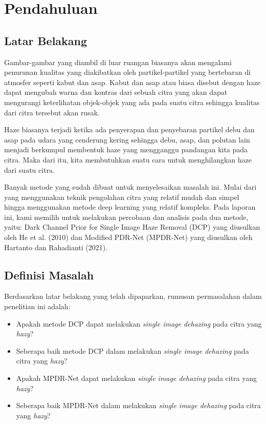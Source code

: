 \documentclass[11pt, a4paper, final]{report}
\begin{document}
\chapter{Pendahuluan}
\section{Latar Belakang}
Gambar-gambar yang diambil di luar ruangan biasanya akan mengalami penurunan kualitas yang diakibatkan oleh partikel-partikel yang bertebaran di atmosfer seperti kabut dan asap. Kabut dan asap atau biasa disebut dengan haze dapat mengubah warna dan kontras dari sebuah citra yang akan dapat mengurangi keterlihatan objek-objek yang ada pada suatu citra sehingga kualitas dari citra tersebut akan rusak.

Haze biasanya terjadi ketika ada penyerapan dan penyebaran partikel debu dan asap pada udara yang cenderung kering sehingga debu, asap, dan polutan lain menjadi berkumpul membentuk haze yang mengganggu pandangan kita pada citra. Maka dari itu, kita membutuhkan suatu cara untuk menghilangkan haze dari suatu citra. 

Banyak metode yang sudah dibuat untuk menyelesaikan masalah ini. Mulai dari yang menggunakan teknik pengolahan citra yang relatif mudah dan simpel hingga menggunakan metode deep learning yang relatif kompleks. Pada laporan ini, kami memilih untuk melakukan percobaan dan analisis pada dua metode, yaitu: Dark Channel Prior for Single Image Haze Removal (DCP) yang diusulkan oleh He et al. (2010) dan Modified PDR-Net (MPDR-Net) yang diusulkan oleh Hartanto dan Rahadianti (2021).

\section{Definisi Masalah}

Berdasarkan latar belakang yang telah dipaparkan, rumusan permasalahan dalam penelitian ini adalah:

\begin{itemize}
    \item Apakah metode DCP dapat melakukan \textit{single image dehazing} pada citra yang \textit{hazy}?
    \item Seberapa baik metode DCP dalam melakukan \textit{single image dehazing} pada citra yang \textit{hazy}?
    \item Apakah MPDR-Net dapat melakukan \textit{single image dehazing} pada citra yang \textit{hazy}?
    \item Seberapa baik MPDR-Net dalam melakukan \textit{single image dehazing} pada citra yang \textit{hazy}?
\end{itemize}
\end{document}
